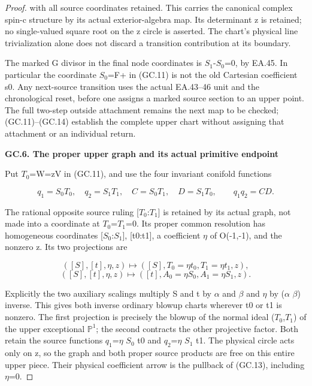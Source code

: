\begin{proof}
with all source coordinates retained. This carries the canonical
complex spin-c structure by its actual exterior-algebra map.
Its determinant z is retained; no single-valued square root on
the z circle is asserted. The chart's physical line trivialization
alone does not discard a transition contribution at its boundary.

The marked G divisor in the final node coordinates is \(S_1\)-\(S_0\)=0,
by EA.45. In particular the coordinate \(S_0\)=F+ in (GC.11) is not
the old Cartesian coefficient s0. Any next-source transition
uses the actual EA.43--46 unit and the chronological reset,
before one assigns a marked source section to an upper point.
The full two-step outside attachment remains the next map to
be checked; (GC.11)--(GC.14) establish the complete upper chart
without assigning that attachment or an individual return.

\par

\medskip\noindent\textbf{GC.6. The proper upper graph and its actual primitive endpoint}

\par\nobreak

Put \(T_0\)=W=zV in (GC.11), and use the four invariant conifold
functions

\[
 q_1=S_0T_0,\quad q_2=S_1T_1,\quad
 C=S_0T_1,\quad D=S_1T_0,\qquad q_1q_2=CD.
 \tag{GC.15}
\]

The rational opposite source ruling {[}\(T_0\):\(T_1\){]} is retained by its
actual graph, not made into a coordinate at \(T_0\)=\(T_1\)=0. Its proper
common resolution has homogeneous coordinates {[}\(S_0\):\(S_1\){]}, {[}t0:t1{]},
a coefficient \(\eta\) of O(-1,-1), and the nonzero z. Its two
projections are

\[
 ([S],[t],\eta,z)\longmapsto
       ([S],T_0=\eta t_0,T_1=\eta t_1,z),
\]
\[
 ([S],[t],\eta,z)\longmapsto
       ([t],A_0=\eta S_0,A_1=\eta S_1,z).
 \tag{GC.16}
\]

Explicitly the two auxiliary scalings multiply S and t by
\(\alpha\) and \(\beta\) and \(\eta\) by (\(\alpha\) \(\beta\)) inverse. This gives
both inverse ordinary blowup charts wherever t0 or t1 is
nonzero. The first projection is precisely the blowup of the
normal ideal (\(T_0\),\(T_1\)) of the upper exceptional \(\mathbb P^1\); the second
contracts the other projective factor. Both retain the source
functions \(q_1\)=\(\eta\) \(S_0\) t0 and \(q_2\)=\(\eta\) \(S_1\) t1. The physical circle
acts only on z, so the graph and both proper source products
are free on this entire upper piece. Their physical coefficient
arrow is the pullback of (GC.13), including \(\eta\)=0.


\end{proof}
